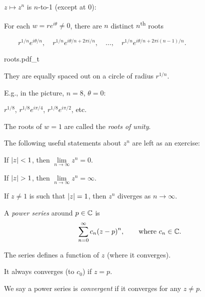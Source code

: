 \documentclass[10pt,aspectratio=169]{beamer}
\begin{document}
\begin{frame}

$z \mapsto z^n$ is $n$-to-1 (except at $0$): 

\medskip
\pause
For each $w = r e^{i\theta} \not=0$, there are $n$ distinct
$n$\textsuperscript{th} roots

\medskip
$\displaystyle
\qquad
r^{1/n} e^{i\theta/n}
, \quad
r^{1/n} e^{i\theta/n + 2\pi i /n}
, \quad \ldots, \quad
r^{1/n} e^{i\theta/n + 2\pi i (n-1)/n} .
$
\medskip
\pause

\vspace*{-0.2in}
\hspace*{3.5in}%
{roots.pdf_t}


\vspace*{-0.9in}
They are equally
spaced out on a circle of radius $r^{1/n}$.

\medskip

E.g., in the picture, $n=8$, $\theta=0$:

\medskip

$r^{1/8}$, $r^{1/8} e^{i \pi / 4}$,  $r^{1/8} e^{i \pi / 2}$,
etc.

\medskip
\pause


The roots of $w=1$ are
called the \emph{roots of unity}.
\end{frame}

\begin{frame}
The following useful statements about $z^n$ are left as an exercise:

\medskip
\pause

If $\lvert {z} \rvert<1$, then $\lim\limits_{n\to \infty} z^n = 0$.

\medskip
\pause

If $\lvert {z} \rvert>1$, then $\lim\limits_{n\to \infty} z^n = \infty$.

\medskip
\pause

If $z \not= 1$ is such that $\lvert {z} \rvert=1$, then $z^n$ diverges as $n \to
\infty$.
\end{frame}

\begin{frame}
A \emph{power series} around $p \in {\mathbb{C}}$ is
\[
\sum_{n=0}^\infty c_n {(z-p)}^n ,
\qquad \text{where } c_n \in {\mathbb{C}}.
\]
\pause

The series defines a function of $z$ (where it converges).

\medskip
\pause

It always converges (to $c_0$) if $z=p$.

\medskip
\pause

We say a power series is \emph{convergent} if
it converges for any $z \not= p$.
\end{frame}
\end{document}
